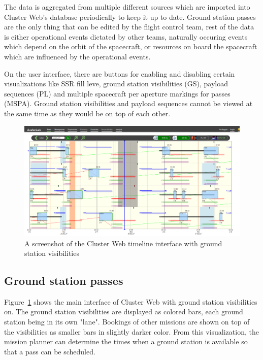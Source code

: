The data is aggregated from multiple different sources which are imported into Cluster Web's database periodically to keep it up to date. Ground station passes are the only thing that can be edited by the flight control team, rest of the data is either operational events dictated by other teams, naturally occuring events which depend on the orbit of the spacecraft, or resources on board the spacecraft which are influenced by the operational events.

On the user interface, there are buttons for enabling and disabling certain visualizations like SSR fill leve, ground station visibilities (GS), payload sequences (PL) and multiple spacecraft per aperture markings for passes (MSPA). Ground station visibilities and payload sequences cannot be viewed at the same time as they would be on top of each other.

\begin{figure}[ht]
  \begin{center}
    \includegraphics*[width=1\textwidth]{clusterweb_visibilities}
  \end{center}
  \caption{A screenshot of the Cluster Web timeline interface with ground station visibilities}
  \label{fig:clusterweb_visibilities}
\end{figure}

\subsection{Ground station passes}
Figure~\ref{fig:clusterweb_visibilities} shows the main interface of Cluster Web with ground station visibilities on. The ground station visibilities are displayed as colored bars, each ground station being in its own "lane". Bookings of other missions are shown on top of the visibilities as smaller bars in slightly darker color. From this visualization, the mission planner can determine the times when a ground station is available so that a pass can be scheduled. 

